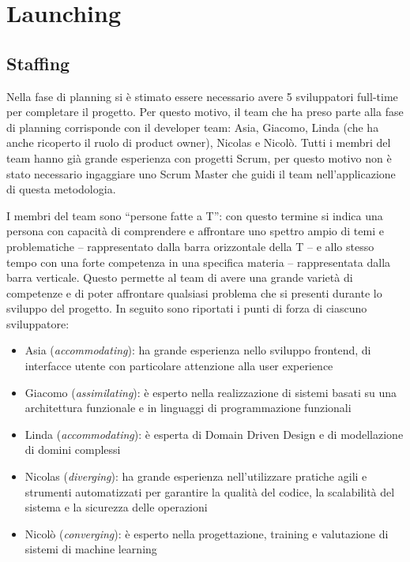\chapter{Launching}\label{ch:launching}

\section{Staffing}\label{sec:staffing}

Nella fase di planning si è stimato essere necessario avere 5 sviluppatori full-time per completare il progetto. Per questo motivo, il team che ha preso parte alla fase di planning corrisponde con il developer team: Asia, Giacomo, Linda (che ha anche ricoperto il ruolo di product owner), Nicolas e Nicolò.
Tutti i membri del team hanno già grande esperienza con progetti Scrum, per questo motivo non è stato necessario ingaggiare uno Scrum Master che guidi il team nell'applicazione di questa metodologia.

I membri del team sono ``persone fatte a T'': con questo termine si indica una persona con capacità di comprendere e affrontare uno spettro ampio di temi e problematiche -- rappresentato dalla barra orizzontale della T -- e allo stesso tempo con una forte competenza in una specifica materia -- rappresentata dalla barra verticale. Questo permette al team di avere una grande varietà di competenze e di poter affrontare qualsiasi problema che si presenti durante lo sviluppo del progetto. In seguito sono riportati i punti di forza di ciascuno sviluppatore:
\begin{itemize}
  \item Asia (\emph{accommodating}): ha grande esperienza nello sviluppo frontend, di interfacce utente con particolare attenzione alla user experience
  \item Giacomo (\emph{assimilating}): è esperto nella realizzazione di sistemi basati su una architettura funzionale e in linguaggi di programmazione funzionali
  \item Linda (\emph{accommodating}): è esperta di Domain Driven Design e di modellazione di domini complessi
  \item Nicolas (\emph{diverging}): ha grande esperienza nell'utilizzare pratiche agili e strumenti automatizzati per garantire la qualità del codice, la scalabilità del sistema e la sicurezza delle operazioni
  \item Nicolò (\emph{converging}): è esperto nella progettazione, training e valutazione di sistemi di machine learning
\end{itemize}

